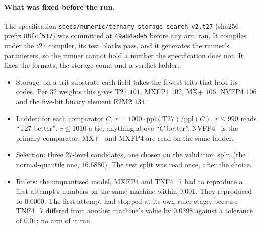 \paragraph{What was fixed before the run.} The specification
\texttt{specs/\allowbreak numeric/\allowbreak ternary\_\allowbreak storage\_\allowbreak search\_\allowbreak v2.t27} (sha256 prefix
\texttt{88fcf517}) was committed at \texttt{49a84ade5} before any arm ran. It
compiles under the t27 compiler, its test blocks pass, and it generates the
runner's parameters, so the runner cannot hold a number the specification does
not. It fixes the formats, the storage count and a verdict ladder.
\begin{itemize}
\item Storage: on a trit substrate each field takes the fewest trits that hold
  its codes. Per $32$ weights this gives T27 $101$, MXFP4 $102$, MX+ $106$,
  NVFP4 $106$ and the five-bit binary element E2M2 $134$.
\item Ladder: for each comparator $C$, $r = 1000\cdot\mathrm{ppl(T27)}/\mathrm{ppl}(C)$.
  $r\le 990$ reads ``T27 better'', $r\le 1010$ a tie, anything above ``$C$
  better''. NVFP4~\cite{nvfp4} is the primary comparator; MX+~\cite{mxplus} and
  MXFP4 are read on the same ladder.
\item Selection: three 27-level candidates, one chosen on the validation split
  (the normal-quantile one, $16.6880$). The test split was read once, after the
  choice.
\item Rulers: the unquantised model, MXFP4 and TNF4\_7 had to reproduce a first
  attempt's numbers on the same machine within $0.001$. They reproduced to
  $0.0000$. The first attempt had stopped at its own ruler stage, because
  TNF4\_7 differed from another machine's value by $0.0398$ against a tolerance
  of $0.01$; no arm of it ran.
\end{itemize}

